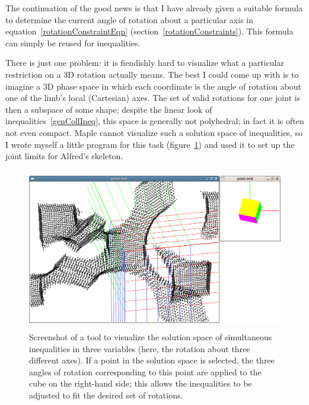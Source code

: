 The continuation of the good news is that I have already given a suitable formula to determine
the current angle of rotation about a particular axis in equation~\ref{rotationConstraintEqn}
(section~\ref{rotationConstraints}). This formula can simply be reused for inequalities.

There is just one problem: it is fiendishly hard to visualize what a particular restriction on
a 3D rotation actually means. The best I could come up with is to imagine a 3D phase space in
which each coordinate is the angle of rotation about one of the limb's local (Cartesian) axes.
The set of valid rotations for one joint is then a subspace of some shape; despite the linear
look of inequalities~\ref{genCollIneq}, this space is generally not polyhedral; in fact it is
often not even compact. Maple cannot visualize such a solution space of inequalities, so I wrote
myself a little program for this task (figure~\ref{jointLimit}) and used it to set up the joint
limits for Alfred's skeleton.

\begin{figure}
\centerline{\includegraphics[width=120mm,height=70.54mm]{figures/jointlimit}}
\caption{Screenshot of a tool to visualize the solution space of simultaneous inequalities in
    three variables (here, the rotation about three different axes). If a point in the solution
    space is selected, the three angles of rotation corresponding to this point are applied to the
    cube on the right-hand side; this allows the inequalities to be adjusted to fit the desired
    set of rotations.\label{jointLimit}}
\end{figure}
